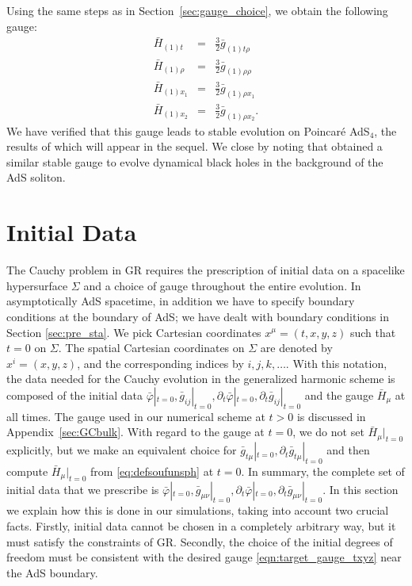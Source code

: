 \documentclass[a4paper,11pt]{article}
\numberwithin{equation}{section}
\begin{document}
Using the same steps as in Section~\ref{sec:gauge_choice}, we obtain the following gauge:
\begin{eqnarray}
\label{eq:hbold_poincare}
\bar{H}_{(1)t}&=&\frac{3}{2} \bar{g}_{(1)\text{$t$$\rho $}} \nonumber\\
\bar{H}_{(1)\rho}&=&\frac{3}{2} \bar{g}_{(1) \rho \rho }\nonumber\\
\bar{H}_{(1)x_1}&=&\frac{3}{2} \bar{g}_{(1) \rho x_1 }\nonumber\\
\bar{H}_{(1)x_2}&=&\frac{3}{2} \bar{g}_{(1) \rho x_2 }.
\end{eqnarray}
We have verified that this gauge leads to stable evolution on Poincar\'e AdS$_4$, the results of which will appear in the sequel. 
We close by noting that \cite{Bantilan:2020pay} obtained a similar stable gauge to evolve dynamical black holes in the background of the AdS soliton. 


\section{Initial Data}
\label{sec:initdata}

The Cauchy problem in GR requires the prescription of initial data on a spacelike hypersurface $\Sigma$ and a choice of gauge throughout the entire evolution. In asymptotically AdS spacetime, in addition we have to specify boundary conditions at the boundary of AdS; we have dealt with boundary conditions in Section \ref{sec:pre_sta}. We pick Cartesian coordinates $x^\mu=(t,x,y,z)$ such that $t=0$ on $\Sigma$. The spatial Cartesian coordinates on $\Sigma$ are denoted by $x^i=(x,y,z)$, and the corresponding indices by $i,j,k,\dots$. %
With this notation, the data needed for the Cauchy evolution in the generalized harmonic scheme is composed of the initial data $\bar{\varphi}|_{t=0},\bar{g}_{ij}|_{t=0},\partial_t\bar{\varphi}|_{t=0},\partial_t\bar{g}_{ij}|_{t=0}$ and the gauge $\bar{H}_\mu$ at all times. The gauge used in our numerical scheme at $t>0$ is discussed in Appendix~\ref{sec:GCbulk}. With regard to the gauge at $t=0$, we do not set $\bar{H}_\mu|_{t=0}$ explicitly, but we make an equivalent choice for $\bar{g}_{t\mu}|_{t=0},\partial_t\bar{g}_{t\mu}|_{t=0}$ and then compute $\bar{H}_\mu|_{t=0}$ from \eqref{eq:defsoufunsph} at $t=0$.
In summary, the complete set of initial data that we prescribe is $\bar{\varphi}|_{t=0},\bar{g}_{\mu\nu}|_{t=0},\partial_t\bar{\varphi}|_{t=0},\partial_t\bar{g}_{\mu\nu}|_{t=0}$. In this section we explain how this is done in our simulations, taking into account two crucial facts. Firstly, initial data cannot be chosen in a completely arbitrary way, but it must satisfy the constraints of GR. Secondly, the choice of the initial degrees of freedom must be consistent with the desired gauge \eqref{eqn:target_gauge_txyz} near the AdS boundary. 
\end{document}

